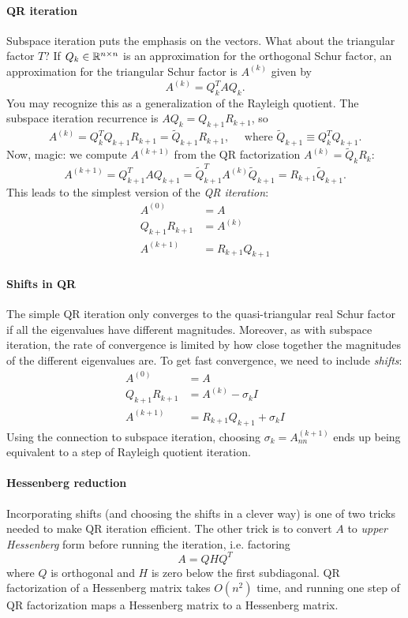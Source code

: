 \documentclass[12pt, leqno]{article}
\begin{document}
\paragraph{QR iteration}
Subspace iteration puts the emphasis on the vectors.  What about the
triangular factor $T$?  If $Q_k \in \mathbb{R}^{n \times n}$ is an
approximation for the orthogonal Schur factor, an approximation for
the triangular Schur factor is $A^{(k)}$ given by
\[
  A^{(k)} = Q_k^T A Q_k.
\]
You may recognize this as a generalization of the Rayleigh quotient.
The subspace iteration recurrence is $A Q_k = Q_{k+1} R_{k+1}$, so
\[
  A^{(k)} = Q_k^T Q_{k+1} R_{k+1} = \tilde{Q}_{k+1} R_{k+1}, \quad
  \mbox{ where } \tilde{Q}_{k+1} \equiv Q_k^T Q_{k+1}.
\]
Now, magic: we compute $A^{(k+1)}$ from
the QR factorization $A^{(k)} = \tilde{Q}_k R_k$:
\[
  A^{(k+1)} = Q_{k+1}^T A Q_{k+1}
    = \tilde{Q}_{k+1}^T A^{(k)} \tilde{Q}_{k+1}
    = R_{k+1} \tilde{Q}_{k+1}.
\]
This leads to the simplest version of the {\em QR iteration}:
\begin{align*}
  A^{(0)} &= A \\
  Q_{k+1} R_{k+1} &= A^{(k)} \\
  A^{(k+1)} &= R_{k+1} Q_{k+1}
\end{align*}

\paragraph{Shifts in QR}
The simple QR iteration only converges to the quasi-triangular
real Schur factor if all the eigenvalues have different magnitudes.
Moreover, as with subspace iteration, the rate of convergence is
limited by how close together the magnitudes of the different
eigenvalues are.  To get fast convergence, we need to include
{\em shifts}:
\begin{align*}
  A^{(0)} &= A \\
  Q_{k+1} R_{k+1} &= A^{(k)} - \sigma_k I\\
  A^{(k+1)} &= R_{k+1} Q_{k+1} + \sigma_k I
\end{align*}
Using the connection to subspace iteration, choosing
$\sigma_k = A^{(k+1)}_{nn}$ ends up being equivalent to a step of Rayleigh
quotient iteration.

\paragraph{Hessenberg reduction}
Incorporating shifts (and choosing the shifts in a clever way) is one
of two tricks needed to make QR iteration efficient.  The other trick
is to convert $A$ to {\em upper Hessenberg} form before running the
iteration, i.e. factoring
\[
  A = Q H Q^T
\]
where $Q$ is orthogonal and $H$ is zero below the first subdiagonal.
QR factorization of a Hessenberg matrix takes $O(n^2)$ time, and
running one step of QR factorization maps a Hessenberg matrix to a
Hessenberg matrix.
\end{document}
